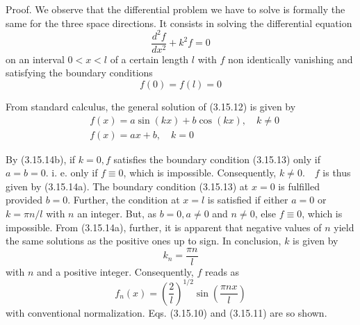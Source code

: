\documentclass{article}
\begin{document}
Proof. We observe that the differential problem we have to solve is formally the same for the three space directions. It consists in solving the differential equation
$$
\begin{equation*}
\frac{d^{2} f}{d x^{2}}+k^{2} f=0 \tag{3.15.12}
\end{equation*}
$$
on an interval $0<x<l$ of a certain length $l$ with $f$ non identically vanishing and satisfying the boundary conditions
$$
\begin{equation*}
f(0)=f(l)=0 \tag{3.15.13}
\end{equation*}
$$

From standard calculus, the general solution of (3.15.12) is given by
$$
\begin{align*}
& f(x)=a \sin (k x)+b \cos (k x), \quad k \neq 0  \tag{3.15.14a}\\
& f(x)=a x+b, \quad k=0 \tag{3.15.14b}
\end{align*}
$$

By (3.15.14b), if $k=0, f$ satisfies the boundary condition (3.15.13) only if $a=b=0$. i. e. only if $f \equiv 0$, which is impossible. Consequently, $k \neq 0 . \quad f$ is thus given by (3.15.14a). The boundary condition (3.15.13) at $x=0$ is fulfilled provided $b=0$. Further, the condition at $x=l$ is satisfied if either $a=0$ or $k=\pi n / l$ with $n$ an integer. But, as $b=0, a \neq 0$ and $n \neq 0$, else $f \equiv 0$, which is impossible. From (3.15.14a),
further, it is apparent that negative values of $n$ yield the same solutions as the positive ones up to sign. In conclusion, $k$ is given by
$$
\begin{equation*}
k_{n}=\frac{\pi n}{l} \tag{3.15.15}
\end{equation*}
$$
with $n$ and a positive integer. Consequently, $f$ reads as
$$
\begin{equation*}
f_{n}(x)=\left(\frac{2}{l}\right)^{1 / 2} \sin \left(\frac{\pi n x}{l}\right) \tag{3.15.16}
\end{equation*}
$$
with conventional normalization. Eqs. (3.15.10) and (3.15.11) are so shown.
\end{document}
